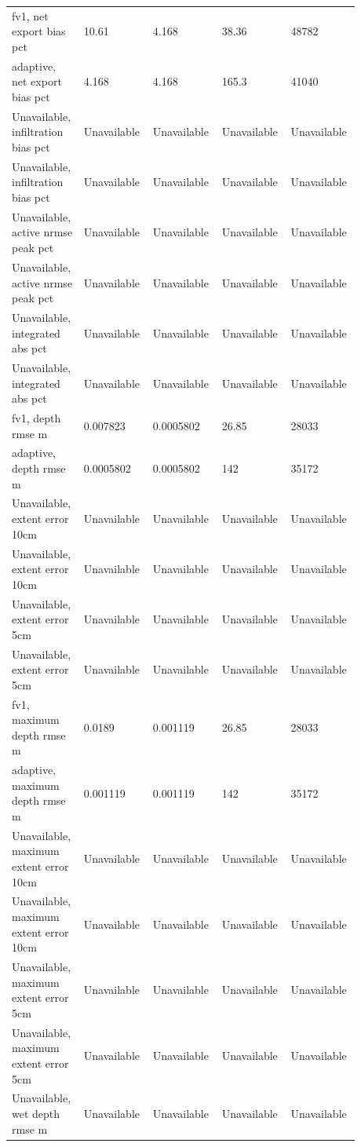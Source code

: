 \begin{longtable}{p{0.1760\linewidth}p{0.1760\linewidth}p{0.1760\linewidth}p{0.1760\linewidth}p{0.1760\linewidth}}
fv1, net export bias pct & 10.61 & 4.168 & 38.36 & 48782 \\
adaptive, net export bias pct & 4.168 & 4.168 & 165.3 & 41040 \\
Unavailable, infiltration bias pct & Unavailable & Unavailable & Unavailable & Unavailable \\
Unavailable, infiltration bias pct & Unavailable & Unavailable & Unavailable & Unavailable \\
Unavailable, active nrmse peak pct & Unavailable & Unavailable & Unavailable & Unavailable \\
Unavailable, active nrmse peak pct & Unavailable & Unavailable & Unavailable & Unavailable \\
Unavailable, integrated abs pct & Unavailable & Unavailable & Unavailable & Unavailable \\
Unavailable, integrated abs pct & Unavailable & Unavailable & Unavailable & Unavailable \\
fv1, depth rmse m & 0.007823 & 0.0005802 & 26.85 & 28033 \\
adaptive, depth rmse m & 0.0005802 & 0.0005802 & 142 & 35172 \\
Unavailable, extent error 10cm & Unavailable & Unavailable & Unavailable & Unavailable \\
Unavailable, extent error 10cm & Unavailable & Unavailable & Unavailable & Unavailable \\
Unavailable, extent error 5cm & Unavailable & Unavailable & Unavailable & Unavailable \\
Unavailable, extent error 5cm & Unavailable & Unavailable & Unavailable & Unavailable \\
fv1, maximum depth rmse m & 0.0189 & 0.001119 & 26.85 & 28033 \\
adaptive, maximum depth rmse m & 0.001119 & 0.001119 & 142 & 35172 \\
Unavailable, maximum extent error 10cm & Unavailable & Unavailable & Unavailable & Unavailable \\
Unavailable, maximum extent error 10cm & Unavailable & Unavailable & Unavailable & Unavailable \\
Unavailable, maximum extent error 5cm & Unavailable & Unavailable & Unavailable & Unavailable \\
Unavailable, maximum extent error 5cm & Unavailable & Unavailable & Unavailable & Unavailable \\
Unavailable, wet depth rmse m & Unavailable & Unavailable & Unavailable & Unavailable \\

\end{longtable}
